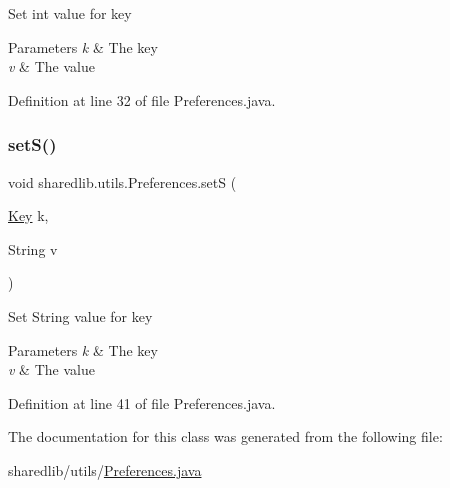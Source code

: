 Set int value for key 
\begin{DoxyParams}{Parameters}
{\em k} & The key \\
\hline
{\em v} & The value \\
\hline
\end{DoxyParams}


Definition at line 32 of file Preferences.\+java.

\hypertarget{classsharedlib_1_1utils_1_1_preferences_ac2faaadd669dbfb98afd18cb2bd31871}{}\label{classsharedlib_1_1utils_1_1_preferences_ac2faaadd669dbfb98afd18cb2bd31871} 
\subsubsection{\texorpdfstring{set\+S()}{setS()}}
{\footnotesize\ttfamily void sharedlib.\+utils.\+Preferences.\+setS (\begin{DoxyParamCaption}\item[{\hyperlink{interfacesharedlib_1_1utils_1_1_preferences_1_1_key}{Key}}]{k,  }\item[{String}]{v }\end{DoxyParamCaption})}

Set String value for key 
\begin{DoxyParams}{Parameters}
{\em k} & The key \\
\hline
{\em v} & The value \\
\hline
\end{DoxyParams}


Definition at line 41 of file Preferences.\+java.



The documentation for this class was generated from the following file\+:\begin{DoxyCompactItemize}
\item 
sharedlib/utils/\hyperlink{_preferences_8java}{Preferences.\+java}\end{DoxyCompactItemize}
